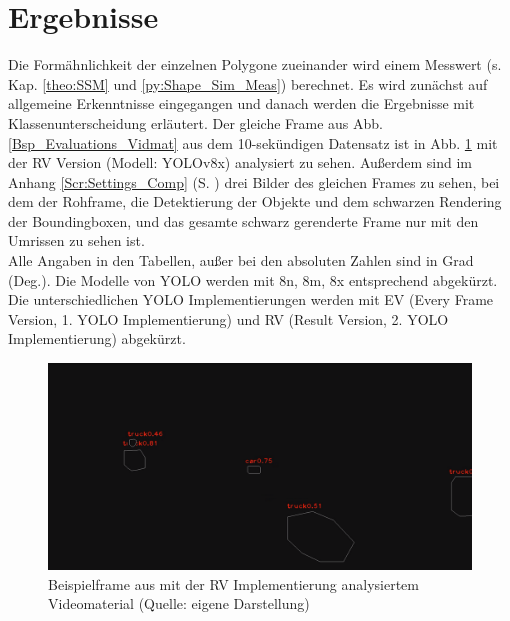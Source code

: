 \section{Ergebnisse\label{sec:Ergebnisse}}  
{Die Formähnlichkeit der einzelnen Polygone zueinander wird einem Messwert  (s. Kap. \ref{theo:SSM} und \ref{py:Shape_Sim_Meas}) berechnet. Es wird zunächst auf allgemeine Erkenntnisse eingegangen und danach werden die Ergebnisse mit Klassenunterscheidung erläutert. Der gleiche Frame aus Abb. \ref{Bsp_Evaluations_Vidmat} aus dem 10-sekündigen Datensatz ist in Abb. \ref{Bsp_ErgebRVA10s_Vidmat} mit der RV Version (Modell: YOLOv8x) analysiert zu sehen. Außerdem sind im Anhang \ref{Scr:Settings_Comp} (S. \pageref{Scr:Settings_Comp}) drei Bilder des gleichen Frames zu sehen, bei dem der Rohframe, die Detektierung der Objekte und dem schwarzen Rendering der Boundingboxen, und das gesamte schwarz gerenderte Frame nur mit den Umrissen zu sehen ist. \\
Alle Angaben in den Tabellen, außer bei den absoluten Zahlen sind in Grad (Deg.). Die Modelle von YOLO werden mit 8n, 8m, 8x entsprechend abgekürzt. Die unterschiedlichen YOLO Implementierungen werden mit EV (Every Frame Version, 1. YOLO Implementierung) und RV (Result Version, 2. YOLO Implementierung) abgekürzt.

\begin{figure}[ht]
	\centering
	\includegraphics*[scale = 0.25, keepaspectratio ]{images/Evaluation/Screenshot_A10s_RV.png}
	\caption[Beispielframe aus mit der RV Implementierung analysiertem Videomaterial]{Beispielframe aus mit der RV Implementierung analysiertem Videomaterial (Quelle: eigene Darstellung)} 
	\label{Bsp_ErgebRVA10s_Vidmat}
\end{figure}

}
